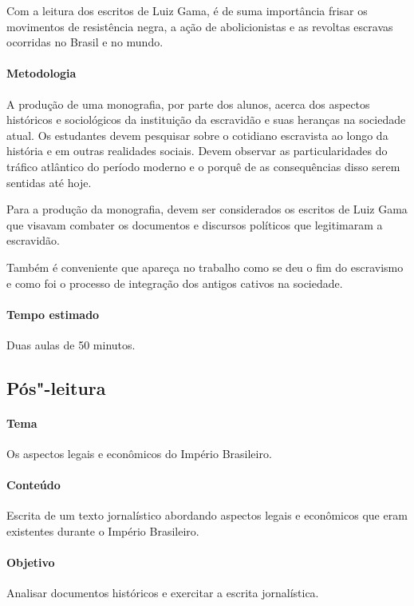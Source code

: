 \documentclass[12pt]{extarticle}
\begin{document}
Com a leitura dos escritos de Luiz Gama, é de suma importância
frisar os movimentos de resistência negra, a ação de abolicionistas
e as revoltas escravas ocorridas no Brasil e no
mundo.

\paragraph{Metodologia} A produção de uma monografia, por parte dos alunos,
acerca dos aspectos históricos e sociológicos da instituição da escravidão
e suas heranças na sociedade atual. Os estudantes devem pesquisar sobre
o cotidiano escravista ao longo da história e em outras realidades sociais.
Devem observar as particularidades do tráfico atlântico do período moderno e 
o porquê de as consequências disso serem sentidas até hoje. 

Para a produção da monografia, devem ser considerados os escritos de Luiz Gama
que visavam combater os documentos e discursos políticos que legitimaram a escravidão.

Também é conveniente que apareça no trabalho como se deu o fim do
escravismo e como foi o processo de integração dos antigos cativos na
sociedade.

\paragraph{Tempo estimado} Duas aulas de 50 minutos.

\subsection{Pós"-leitura}

\paragraph{Tema} Os aspectos legais e econômicos do Império Brasileiro.

\paragraph{Conteúdo} Escrita de um texto jornalístico abordando aspectos legais e
econômicos que eram existentes durante o Império Brasileiro.

\paragraph{Objetivo} Analisar documentos históricos e exercitar a escrita jornalística.
\end{document}
